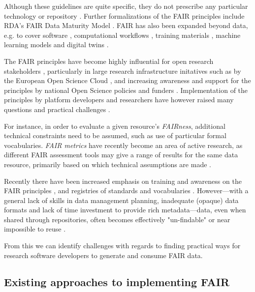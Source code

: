 Although these guidelines are quite specific, they do not prescribe any particular technology or repository \cite{Mons 2017}. Further formalizations of the FAIR principles include RDA's FAIR Data Maturity Model \cite{FAIR Maturity 2020,Bahui 2020}. FAIR has also been expanded beyond data, e.g. to cover software \cite{Katz 2021b}, computational workflows \cite{Goble 2020}, training materials \cite{Garcia 2020a}, machine learning models \cite{Duarte 2023} and digital twins \cite{Schultes 2022}. 

The FAIR principles have become highly influential for open research stakeholders \cite{Jacobsen 2020}, particularly in large research infrastructure initatives such as by the European Open Science Cloud  \cite{Schouppe 2018}, and increasing awareness and support for the principles by national Open Science policies and funders \cite{Davidson 2019,Davidson 2022}.
Implementation of the principles by platform developers and researchers have however raised many questions and practical challenges \cite{Mons 2020,Riungu-Kalliosaari 2022}. 

For instance, in order to evaluate a given resource's \emph{FAIRness}, additional technical constraints need to be assumed, such as use of particular formal vocabularies. \emph{FAIR metrics} \cite{Wilkinson 2018,Devaraju 2021} have recently become an area of active research, as different FAIR assessment tools may give a range of results for the same data resource, primarily based on which technical assumptions are made \cite{Wilkinson 2022a,Verburg 2023}.

Recently there have been increased emphasis on training and awareness on the FAIR principles \cite{Shanahan 2021,Rocca-Serra 2023}, and registries of standards and vocabularies \cite{Sansone 2019}.
However---with a general lack of skills in data management planning, inadequate (opaque) data formats and lack of time investment to provide rich metadata---data, even when shared through repositories, often becomes effectively "un-findable" or near impossible to reuse \cite{Carballo-Garcia 2022}.

From this we can identify challenges with regards to finding practical ways for research software developers to generate and consume FAIR data.



\subsection{Existing approaches to implementing FAIR}

